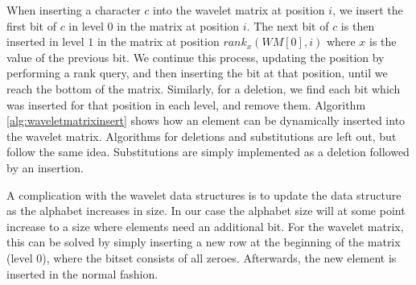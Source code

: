 When inserting a character $c$ into the wavelet matrix at position $i$, we insert the
first bit of $c$ in level $0$ in the matrix at position $i$. The next bit of $c$ is then
inserted in level $1$ in the matrix at position $rank_x(WM[0], i)$ where $x$ is the value
of the previous bit. We continue this process, updating the position by performing a rank
query, and then inserting the bit at that position, until we reach the bottom of the
matrix. Similarly, for a deletion, we find each bit which was inserted for that position
in each level, and remove them. Algorithm \ref{alg:waveletmatrixinsert} shows how an
element can be dynamically inserted into the wavelet matrix. Algorithms for deletions and
substitutions are left out, but follow the same idea. Substitutions are simply implemented
as a deletion followed by an insertion.

A complication with the wavelet data structures is to update the data structure as the
alphabet increases in size. In our case the alphabet size will at some point increase to a
size where elements need an additional bit. For the wavelet matrix, this can be solved by
simply inserting a new row at the beginning of the matrix (level $0$), where the bitset
consists of all zeroes. Afterwards, the new element is inserted in the normal fashion.

